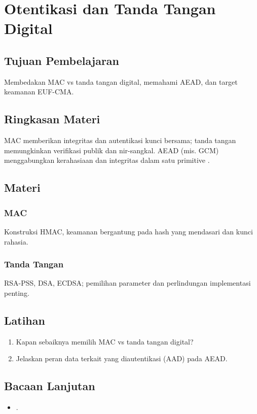 \documentclass[../main.tex]{subfiles}
\begin{document}
\chapter{Otentikasi dan Tanda Tangan Digital}
\section{Tujuan Pembelajaran}
Membedakan MAC vs tanda tangan digital, memahami AEAD, dan target keamanan EUF-CMA.

\section{Ringkasan Materi}
MAC memberikan integritas dan autentikasi kunci bersama; tanda tangan memungkinkan verifikasi publik dan nir-sangkal. AEAD (mis. GCM) menggabungkan kerahasiaan dan integritas dalam satu primitive \citep{sp80038d,bonehshoup}.

\section{Materi}
\subsection{MAC}
Konstruksi HMAC, keamanan bergantung pada hash yang mendasari dan kunci rahasia.

\subsection{Tanda Tangan}
RSA-PSS, DSA, ECDSA; pemilihan parameter dan perlindungan implementasi penting.

\section{Latihan}
\begin{enumerate}
  \item Kapan sebaiknya memilih MAC vs tanda tangan digital?
  \item Jelaskan peran data terkait yang diautentikasi (AAD) pada AEAD.
\end{enumerate}

\section{Bacaan Lanjutan}
\begin{itemize}
  \item \citep{sp80038d,bonehshoup}.
\end{itemize}
\end{document}
